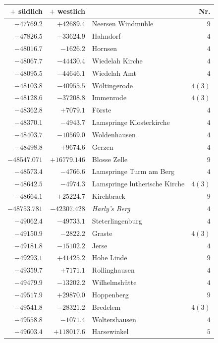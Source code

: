 \clearpage{}%
\begin{center}\begingroup\fontsize{8}{9}\selectfont
\setlength{\tabcolsep}{4pt}
\begin{tabular}{r|r|p{170pt}|r}\hline
\(+\) südlich&\(+\) westlich&&Nr.\\\hline
\(-47769.2\)&\(+42689.4\)&Neersen Windmühle&\(9\)\\
\(-47826.5\)&\(-33624.9\)&Hahndorf&\(4\)\\
\(-48016.7\)&\(-1626.2\)&Hornsen&\(4\)\\
\(-48067.7\)&\(-44430.4\)&Wiedelah Kirche&\(4\)\\
\(-48095.5\)&\(-44646.1\)&Wiedelah Amt&\(4\)\\
\(-48103.8\)&\(-40955.5\)&Wöltingerode&\(4 (3)\)\\
\(-48128.6\)&\(-37208.8\)&Immenrode&\(4 (3)\)\\
\(-48362.8\)&\(+7079.1\)&Förste&\(4\)\\
\(-48370.1\)&\(-4943.7\)&Lamspringe Klosterkirche&\(4\)\\
\(-48403.7\)&\(-10569.0\)&Woldenhausen&\(4\)\\
\(-48498.8\)&\(+9674.6\)&Gerzen&\(4\)\\
\(-48547.071\)&\(+16779.146\)&Blosse Zelle&\(9\)\\
\(-48573.4\)&\(-4766.6\)&Lamspringe Turm am Berg&\(4\)\\
\(-48642.5\)&\(-4974.3\)&Lamspringe lutherische Kirche&\(4 (3)\)\\
\(-48664.1\)&\(+25224.7\)&Kirchbrack&\(9\)\\
\(-48753.781\)&\(-42307.428\)&\textit{Harly’s Berg}&\(4\)\\
\(-49062.4\)&\(-49733.1\)&Steterlingenburg&\(4\)\\
\(-49150.9\)&\(-2822.2\)&Graste&\(4 (3)\)\\
\(-49181.8\)&\(-15102.2\)&Jerse&\(4\)\\
\(-49293.1\)&\(+41425.2\)&Hohe Linde&\(9\)\\
\(-49359.7\)&\(+7171.1\)&Rollinghausen&\(4\)\\
\(-49479.9\)&\(-13202.2\)&Wilhelmshütte&\(4\)\\
\(-49517.9\)&\(+29870.0\)&Hoppenberg&\(9\)\\
\(-49541.8\)&\(-28321.2\)&Bredelem&\(4 (3)\)\\
\(-49558.8\)&\(-1071.4\)&Woltershausen&\(4\)\\
\(-49603.4\)&\(+118017.6\)&Harsewinkel&\(5\)\\

\end{tabular}
\end{center}
